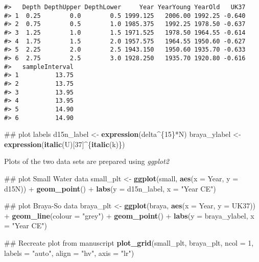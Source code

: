 \documentclass[12pt,]{article}
\newenvironment{Shaded}{\begin{snugshade}}{\end{snugshade}}
\newcommand{\KeywordTok}[1]{\textcolor[rgb]{0.13,0.29,0.53}{\textbf{{#1}}}}
\newcommand{\DataTypeTok}[1]{\textcolor[rgb]{0.13,0.29,0.53}{{#1}}}
\newcommand{\DecValTok}[1]{\textcolor[rgb]{0.00,0.00,0.81}{{#1}}}
\newcommand{\StringTok}[1]{\textcolor[rgb]{0.31,0.60,0.02}{{#1}}}
\newcommand{\NormalTok}[1]{{#1}}
\begin{document}
\begin{verbatim}
#>   Depth DepthUpper DepthLower     Year YearYoung YearOld   UK37
#> 1  0.25        0.0        0.5 1999.125   2006.00 1992.25 -0.640
#> 2  0.75        0.5        1.0 1985.375   1992.25 1978.50 -0.637
#> 3  1.25        1.0        1.5 1971.525   1978.50 1964.55 -0.614
#> 4  1.75        1.5        2.0 1957.575   1964.55 1950.60 -0.627
#> 5  2.25        2.0        2.5 1943.150   1950.60 1935.70 -0.633
#> 6  2.75        2.5        3.0 1928.250   1935.70 1920.80 -0.616
#>   sampleInterval
#> 1          13.75
#> 2          13.75
#> 3          13.95
#> 4          13.95
#> 5          14.90
#> 6          14.90
\end{verbatim}

\begin{Shaded}
\begin{Highlighting}[]
\NormalTok{## plot labels}
\NormalTok{d15n_label <-}\StringTok{ }\KeywordTok{expression}\NormalTok{(delta^\{}\DecValTok{15}\NormalTok{\}*N)}
\NormalTok{braya_ylabel <-}\StringTok{ }\KeywordTok{expression}\NormalTok{(}\KeywordTok{italic}\NormalTok{(U)[}\DecValTok{37}\NormalTok{]^\{}\KeywordTok{italic}\NormalTok{(k)\})}
\end{Highlighting}
\end{Shaded}

Plots of the two data sets are prepared using \emph{ggplot2}

\begin{Shaded}
\begin{Highlighting}[]
\NormalTok{## plot Small Water data}
\NormalTok{small_plt <-}\StringTok{ }\KeywordTok{ggplot}\NormalTok{(small, }\KeywordTok{aes}\NormalTok{(}\DataTypeTok{x =} \NormalTok{Year, }\DataTypeTok{y =} \NormalTok{d15N)) +}
\StringTok{    }\KeywordTok{geom_point}\NormalTok{() +}
\StringTok{    }\KeywordTok{labs}\NormalTok{(}\DataTypeTok{y =} \NormalTok{d15n_label, }\DataTypeTok{x =} \StringTok{"Year CE"}\NormalTok{)}

\NormalTok{## plot Braya-So data}
\NormalTok{braya_plt <-}\StringTok{ }\KeywordTok{ggplot}\NormalTok{(braya, }\KeywordTok{aes}\NormalTok{(}\DataTypeTok{x =} \NormalTok{Year, }\DataTypeTok{y =} \NormalTok{UK37)) +}
\StringTok{    }\KeywordTok{geom_line}\NormalTok{(}\DataTypeTok{colour =} \StringTok{"grey"}\NormalTok{) +}
\StringTok{    }\KeywordTok{geom_point}\NormalTok{() +}
\StringTok{    }\KeywordTok{labs}\NormalTok{(}\DataTypeTok{y =} \NormalTok{braya_ylabel, }\DataTypeTok{x =} \StringTok{"Year CE"}\NormalTok{)}

\NormalTok{## Recreate plot from manuscript}
\KeywordTok{plot_grid}\NormalTok{(small_plt, braya_plt, }\DataTypeTok{ncol =} \DecValTok{1}\NormalTok{, }\DataTypeTok{labels =} \StringTok{"auto"}\NormalTok{, }\DataTypeTok{align =} \StringTok{"hv"}\NormalTok{,}
          \DataTypeTok{axis =} \StringTok{"lr"}\NormalTok{)}
\end{Highlighting}
\end{Shaded}
\end{document}
